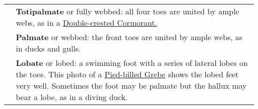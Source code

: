 \documentclass[10pt]{article}
\begin{document}
\begin{longtable}{@{}C{0.45\textwidth}L{0.45\textwidth}@{}}
%
& \textbf{Totipalmate} or fully webbed: all four toes are united by ample webs, as in a \href{https://www.allaboutbirds.org/guide/Double-crested_Cormorant}{Double-crested Cormorant.} \\ [2.5cm]
%
& \textbf{Palmate} or webbed: the front toes are united by ample webs, as in ducks and gulls. \\ [2.5cm]
%
& \textbf{Lobate} or lobed: a swimming foot with a series of lateral lobes on the toes. This photo of a \href{https://www.allaboutbirds.org/guide/Pied-billed_Grebe/media-browser/63919971}{Pied-billed Grebe} shows the lobed feet very well. Sometimes the foot may be palmate but the hallux may bear a lobe, as in a diving duck. \\ [2.5cm]
%

\bottomrule
\end{longtable}
\end{document}
